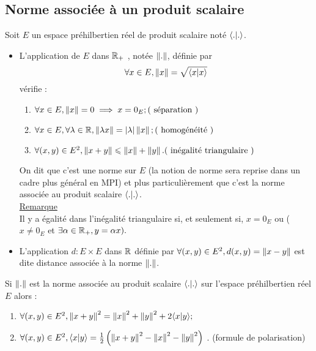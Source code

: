 \subsection{Norme associée à un produit scalaire}
Soit \(E\) un espace préhilbertien réel de produit scalaire noté \(\langle . | . \rangle\).
\begin{defprop}
    \begin{itemize}
    \item L’application de \(E\) dans \(\mathbb{R}_+\) , notée \(\left\|.\right\|\), définie par
        \[\forall x \in E, \left\|x\right\| = \sqrt{\langle x | x \rangle}\]
    vérifie :
    \begin{enumerate}
        \item\( \forall x \in E, \norme{x} = 0 \imp x = 0_E ; \hfill( \text{ séparation })\)
        \item\( \forall x \in E, \forall \lambda  \in \R, \norme{\lambda x} = \abs{\lambda } \norme{x} ;\hfill (\text{ homogénéité })\)
        \item\( \forall (x, y) \in E^2, \norme{x +y} \leq \norme{x} + \norme{y} . \hfill(\text{ inégalité triangulaire })\)
    \end{enumerate}
    On dit que c’est une norme sur \(E\) (la notion de norme sera reprise dans un cadre plus général en MPI) et plus particulièrement que c’est la norme associée au produit scalaire \(\langle . | . \rangle\).\\
    \underline{Remarque}\\
    Il y a égalité dans l’inégalité triangulaire si, et seulement si, \(x = 0_E\) ou (\(x\neq 0_E\) et \(\exists \alpha \in \mathbb{R}_+, y = \alpha x).\)
    \item L’application \(d : E \times E\) dans \(\mathbb{R}\) définie par \(\forall (x, y) \in E^2, d(x, y) = \left\|x-y\right\|\) est dite distance associée à la norme \( \left\|.\right\|\).
\end{itemize}
\end{defprop}
\begin{defprop}
    Si \(\left\|.\right\|\) est la norme associée au produit scalaire \(\langle . | . \rangle\) sur l’espace préhilbertien réel \(E\) alors :
    \begin{enumerate}
        \item \( \forall (x, y) \in E^2, \left\|x +y \right\|^2 = \left\|x\right\|^2 + \left\|y\right\|^2 + 2 \langle x | y \rangle ;\)
        \item \( \forall (x, y) \in E^2, \langle x | y \rangle = \frac{1}{2}\left(\left\|x +y\right\|^2 - \left\|x\right\|^2 - \left\|y\right\|^2\right)\) . \hfill (formule de polarisation)
    \end{enumerate}
\end{defprop}

